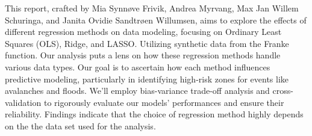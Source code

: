 \thispagestyle{plain}

\noindent This report, crafted by Mia Synnøve Frivik, Andrea Myrvang, Max Jan Willem Schuringa, and Janita Ovidie Sandtrøen Willumsen, aims to explore the effects of different regression methods on data modeling, focusing on Ordinary Least Squares (OLS), Ridge, and LASSO. Utilizing synthetic data from the Franke function. Our analysis puts a lens on how these regression methods handle various data types. Our goal is to ascertain how each method influences predictive modeling, particularly in identifying high-risk zones for events like avalanches and floods. We'll employ bias-variance trade-off analysis and cross-validation to rigorously evaluate our models' performances and ensure their reliability. Findings indicate that the choice of regression method highly depends on the the data set used for the analysis. 

